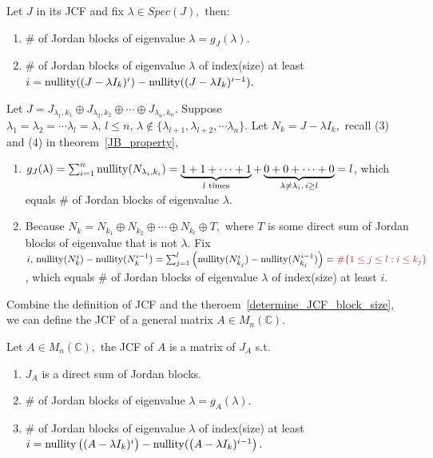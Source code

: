 \begin{theorem}
    Let $J$ in its JCF and fix $\lambda\in Spec(J),$ then:
    \begin{enumerate}
        \item \# of Jordan blocks of eigenvalue $\lambda = g_J(\lambda).$
        \item \# of Jordan blocks of eigenvalue $\lambda$ of index(size) at least $i = \operatorname{nullity}((J-\lambda I_k)^i) - \operatorname{nullity}((J-\lambda I_k)^{i-1}).$
    \end{enumerate}
\end{theorem}


\begin{pfbox}
    Let $J=J_{\lambda_1,k_1}\oplus J_{\lambda_2,k_2}\oplus\cdots\oplus J_{\lambda_n,k_n}.$ Suppose $\lambda_1=\lambda_2=\cdots\lambda_l=\lambda,\, l\le n,\, \lambda\notin\{\lambda_{l+1},\lambda_{l+2},\cdots\lambda_{n}\}.$
    Let $N_k=J-\lambda I_k,$ recall (3) and (4) in theorem~\eqref{JB_property},
    \begin{enumerate}
        \item $g_J(\lambda)=\sum_{i=1}^{n}\operatorname{nullity}(N_{\lambda_i, k_i}) = \underbrace{1+1+\cdots+1}_{l \text{ times}} + \underbrace{0+0+\cdots+0}_{\lambda\ne\lambda_i,\, i\ge l}=l$,
        which equals \# of Jordan blocks of eigenvalue $\lambda.$
        \item Because $N_k=N_{k_1}\oplus N_{k_2}\oplus\cdots\oplus N_{k_l}\oplus T,$ where $T$ is some direct sum of Jordan blocks of eigenvalue that is not $\lambda.$
        Fix $i,\,\nullity(N^i_k)-\nullity(N^{i-1}_k)=\sum_{j=1}^{l}\left(\nullity(N^i_{k_j})-\nullity(N^{i-1}_{k_j})\right)=\textcolor{darkred}{\#\{1\le j\le l:i\le k_j\}}$, which equals
        \# of Jordan blocks of eigenvalue $\lambda$ of index(size) at least $i$.
    \end{enumerate}
\label{determine_JCF_block_size}
\end{pfbox}


Combine the definition of JCF and the theroem~\eqref{determine_JCF_block_size}, we can define the JCF of a general matrix $A\in M_n(\mathbb{C}).$

\begin{definition}
    Let $A\in M_n(\mathbb{C}),$ the JCF of $A$ is a matrix of $J_A$ s.t.
    \begin{enumerate}
        \item $J_A$ is a direct sum of Jordan blocks.
        \item \# of Jordan blocks of eigenvalue $\lambda = g_A(\lambda).$
        \item \# of Jordan blocks of eigenvalue $\lambda$ of index(size) at least $i = \operatorname{nullity}\left((A -\lambda I_k)^i\right) - \operatorname{nullity}(\left(A -\lambda I_k)^{i-1}\right).$
    \end{enumerate}
\end{definition}

